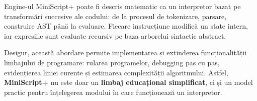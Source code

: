 \documentclass[12pt]{article}
\begin{document}
Engine-ul MiniScript+ poate fi descris matematic ca un interpretor bazat pe transformări succesive ale codului: de la procesul de tokenizare, parsare, construire AST până la evaluare. Fiecare instrucțiune modifică un state intern, iar expresiile sunt evaluate recursiv pe baza arborelui sintactic abstract.

Desigur, această abordare permite implementarea și extinderea funcționalității limbajului de programare: rularea programelor, debugging pas cu pas, evidențierea liniei curente și estimarea complexității algoritmului. Astfel, \textbf{MiniScript+} nu este doar un \textbf{limbaj educațional simplificat}, ci și un model practic pentru înțelegerea modului în care funcționează un interpretor.
\end{document}
